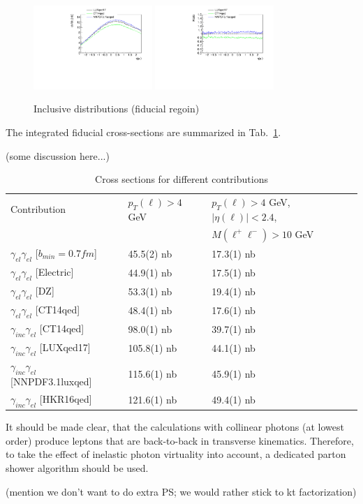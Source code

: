 \begin{figure}[h!]
\includegraphics[width=0.4\textwidth]{figures/etal_inc_cut.pdf}
\includegraphics[width=0.4\textwidth]{figures/Ratioetal_inc_cut.pdf}
\caption{Inclusive distributions (fiducial regoin)}
\label{fig:inc_cut}
\end{figure}

The integrated fiducial cross-sections are summarized in Tab.~\ref{fig:xs}.

(some discussion here...)

\begin{table}[!ht]
\begin{center}
\begin{tabular}{|l|l|l|}
\hline
Contribution & $p_T(\ell) > 4$ GeV & $p_T(\ell) > 4$ GeV, $|\eta(\ell)| < 2.4$,\\
& & $M(\ell^+\ell^-) > 10$ GeV\\
\hline
$\gamma_{el}\gamma_{el}$ [$b_{min}=0.7fm$] & 45.5(2) nb & 17.3(1) nb\\
\hline
$\gamma_{el}\gamma_{el}$ [Electric] & 44.9(1) nb & 17.5(1) nb\\
\hline
$\gamma_{el}\gamma_{el}$ [DZ] & 53.3(1) nb & 19.4(1) nb\\
\hline
$\gamma_{el}\gamma_{el}$ [CT14qed] & 48.4(1) nb & 17.6(1) nb\\
\hline
$\gamma_{inc}\gamma_{el}$ [CT14qed] & 98.0(1) nb & 39.7(1) nb\\
\hline
$\gamma_{inc}\gamma_{el}$ [LUXqed17] & 105.8(1) nb & 44.1(1) nb\\
\hline
$\gamma_{inc}\gamma_{el}$ [NNPDF3.1luxqed] & 115.6(1) nb & 45.9(1) nb\\
\hline
$\gamma_{inc}\gamma_{el}$ [HKR16qed] & 121.6(1) nb & 49.4(1) nb\\
\hline
\end{tabular}
\end{center}
\caption{Cross sections for different contributions}
\label{fig:xs}
\end{table}

It should be made clear, that the calculations with collinear photons (at lowest order) produce leptons that are back-to-back in transverse kinematics. Therefore, to take the effect of inelastic photon virtuality into account, a dedicated parton shower algorithm should be used.

(mention we don't want to do extra PS; we would rather stick to kt factorization)
